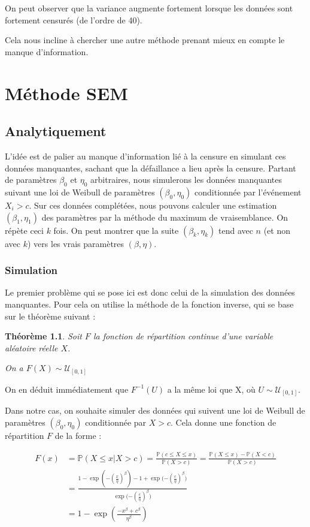 \documentclass[a4paper]{report}
\newtheorem{theorem}{Théorème}
\begin{document}
On peut observer que la variance augmente fortement lorsque les données sont fortement censurés (de l'ordre de 40).

Cela nous incline à chercher une autre méthode prenant mieux en compte le manque d'information. 

  \chapter {Méthode SEM}
  
  \section{Analytiquement}
  
  L'idée est de palier au manque d'information lié à la censure en simulant ces données manquantes, sachant que la défaillance a lieu après la censure. Partant de paramètres $\beta_0$ et $\eta_0$ arbitraires, nous simulerons les données manquantes suivant une loi de Weibull de paramètres $(\beta_0,\eta_0)$ conditionnée par l’événement ${X_i >c}$. Sur ces données complétées, nous pouvons calculer une estimation $(\beta_1,\eta_1)$ des paramètres par la méthode du maximum de vraisemblance. On répète ceci $k$ fois. On peut montrer que la suite $(\beta_k, \eta_k)$ tend avec $n$ (et non avec $k$) vers les vrais paramètres $(\beta,\eta)$.
  
  \subsection{Simulation}
  
  Le premier problème qui se pose ici est donc celui de la simulation des données manquantes. Pour cela on utilise la méthode de la fonction inverse, qui se base sur le théorème suivant : 
  
 \begin{theorem}
Soit $F$ la fonction de répartition continue d'une variable aléatoire réelle $X$. 

On a $F(X) \sim \mathcal{U}_{[0,1]}$
\end{theorem}
  
 On en déduit immédiatement que $F^{-1}(U)$ a la même loi que X, où $U\sim\mathcal{U}_{[0,1]}$. 
 
Dans notre cas, on souhaite simuler des données qui suivent une loi de Weibull de paramètres $(\beta_0,\eta_0)$ conditionnée par ${X>c}$. Cela donne une fonction de répartition $F$ de la forme :
 
 \begin{align*}
 F(x) & =  \mathbb{P}(X \leq x | X > c) = \frac{\mathbb{P}(c \leq X \leq x)}{\mathbb{P}(X>c)} 
= \frac{\mathbb{P} (X \leq x) - \mathbb{P}(X<c)}{\mathbb{P}(X>c)} \\
&= \frac{1-\exp{(-(\frac{x}{\eta})^{\beta})} - 1 + \exp{(-(\frac{c}{\eta})^{\beta}})}{\exp{(-(\frac{c}{\eta})^{\beta}})} \\
&= 1 - \exp{\left( \frac{-x^{\beta}+c^{\beta}}{\eta^{\beta}} \right)}
\end{align*}
\end{document}
